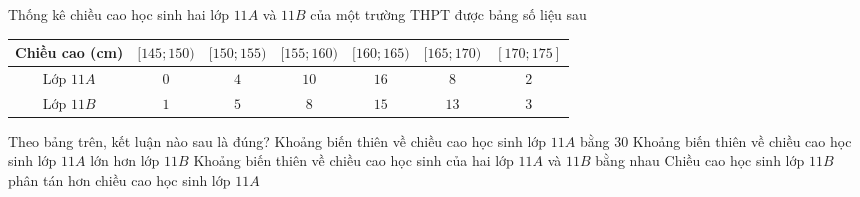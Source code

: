 \begin{ex}%
	Thống kê chiều cao học sinh hai lớp $11A$ và $11B$ của một trường THPT được bảng số liệu sau
	\begin{center}
		\begin{tabular}{|c|c|c|c|c|c|c|}
			\hline
			Chiều cao (cm) & {$[145; 150)$} & {$[150; 155)$} & {$[155; 160)$} & {$[160; 165)$} & {$[165; 170)$} & {$[170; 175]$} \\
			\hline
			Lớp $11A$      & $0$            & $4$            & $10$           & $16$           & $8$            & $2$            \\
			\hline
			Lớp $11B$      & $1$            & $5$            & $8$            & $15$           & $13$           & $3$            \\
			\hline
		\end{tabular}
	\end{center}
	Theo bảng trên, kết luận nào sau là đúng?
	\choice
	{Khoảng biến thiên về chiều cao học sinh lớp $11A$ bằng $30$}
	{Khoảng biến thiên về chiều cao học sinh lớp $11A$ lớn hơn lớp $11B$}
	{Khoảng biến thiên về chiều cao học sinh của hai lớp $11A$ và $11B$ bằng nhau}
	{\True Chiều cao học sinh lớp $11B$ phân tán hơn chiều cao học sinh lớp $11A$}
\end{ex}

